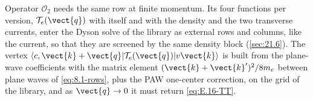 Operator $\mathcal{O}_2$ needs the same row at finite momentum. Its four functions per version, $\mathcal{T}_e(\vect{q})$ with itself and with the density and the two transverse currents, enter the Dyson solve of the library as external rows and columns, like the current, so that they are screened by the same density block (\cref{sec:21.6}). The vertex $\langle c,\vect{k}+\vect{q}|\mathcal{T}_e(\vect{q})|v\vect{k}\rangle$ is built from the plane-wave coefficients with the matrix element $(\vect{k}+\vect{k}')^2/8m_e$ between plane waves of \cref{eq:8.1-rows}, plus the PAW one-center correction, on the grid of the library, and as $\vect{q}\to0$ it must return \cref{eq:E.16-TT}.
